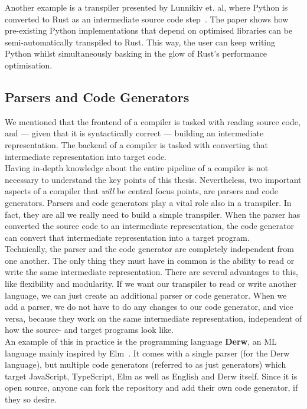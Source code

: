 Another example is a transpiler presented by Lunnikiv et. al, where Python is converted to Rust as an intermediate source code step~\cite{PythonToRust}. The paper shows how pre-existing Python implementations that depend on optimised libraries can be semi-automatically transpiled to Rust. This way, the user can keep writing Python whilst simultaneously basking in the glow of Rust's performance optimisation.

\subsection{Parsers and Code Generators}

We mentioned that the frontend of a compiler is tasked with reading source code, and --- given that it is syntactically correct --- building an intermediate representation. The backend of a compiler is tasked with converting that intermediate representation into target code. \\

Having in-depth knowledge about the entire pipeline of a compiler is not necessary to understand the key points of this thesis. Nevertheless, two important aspects of a compiler that \textit{will} be central focus points, are parsers and code generators. Parsers and code generators play a vital role also in a transpiler. In fact, they are all we really need to build a simple transpiler. When the parser has converted the source code to an intermediate representation, the code generator can convert that intermediate representation into a target program. \\

Technically, the parser and the code generator are completely independent from one another. The only thing they must have in common is the ability to read or write the same intermediate representation. There are several advantages to this, like flexibility and modularity. If we want our transpiler to read or write another language, we can just create an additional parser or code generator. When we add a parser, we do not have to do any changes to our code generator, and vice versa, because they work on the same intermediate representation, independent of how the source- and target programs look like. \\

An example of this in practice is the programming language \textbf{Derw}, an ML language mainly inspired by Elm~\cite{derw}. It comes with a single parser (for the Derw language), but multiple code generators (referred to as just generators) which target JavaScript, TypeScript, Elm as well as English and Derw itself. Since it is open source, anyone can fork the repository and add their own code generator, if they so desire. \\

